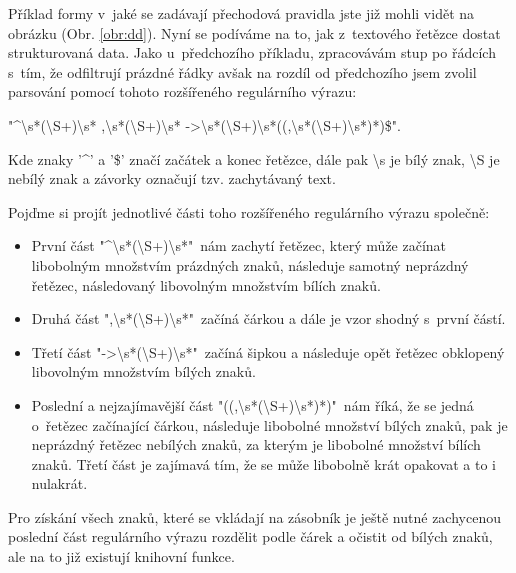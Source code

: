 
Příklad formy v~jaké se zadávají přechodová pravidla jste již mohli vidět na obrázku (Obr. \ref{obr:dd}). Nyní se podíváme na to, jak z~textového řetězce dostat strukturovaná data. Jako u~předchozího příkladu, zpracovávám stup po řádcích s~tím, že odfiltrují prázdné řádky avšak na rozdíl od předchozího jsem zvolil parsování pomocí tohoto rozšířeného regulárního výrazu: 

"\textasciicircum\textbackslash{}s*(\textbackslash{}S+)\textbackslash{}s*
,\textbackslash{}s*(\textbackslash{}S+)\textbackslash{}s*
->\textbackslash{}s*(\textbackslash{}S+)\textbackslash{}s*((,\textbackslash{}s*(\textbackslash{}S+)\textbackslash{}s*)*)\$". 

Kde znaky '\textasciicircum' a '\$' značí začátek a konec řetězce, dále pak \textbackslash{}s je bílý znak, \textbackslash{}S je nebílý znak a závorky označují tzv. zachytávaný text.

Pojďme si projít jednotlivé části toho rozšířeného regulárního výrazu společně:

\begin{itemize}
	\item První část "\textasciicircum\textbackslash{}s*(\textbackslash{}S+)\textbackslash{}s*"\ nám zachytí řetězec, který může začínat libobolným množstvím prázdných znaků, následuje samotný neprázdný řetězec, následovaný libovolným množstvím bílích znaků.
	\item Druhá část ",\textbackslash{}s*(\textbackslash{}S+)\textbackslash{}s*"\ začíná čárkou a dále je vzor shodný s~první částí.
	\item Třetí část "->\textbackslash{}s*(\textbackslash{}S+)\textbackslash{}s*"\ začíná šipkou a následuje opět řetězec obklopený libovolným množstvím bílých znaků.
	\item Poslední a nejzajímavější část "((,\textbackslash{}s*(\textbackslash{}S+)\textbackslash{}s*)*)"\ nám říká, že se jedná o~řetězec začínající čárkou, následuje libobolné množství bílých znaků, pak je neprázdný řetězec nebílých znaků, za kterým je libobolné množství bílích znaků. Třetí část je zajímavá tím, že se může libobolně krát opakovat a to i nulakrát.
\end{itemize}

Pro získání všech znaků, které se vkládají na zásobník je ještě nutné zachycenou poslední část regulárního výrazu rozdělit podle čárek a očistit od bílých znaků, ale na to již existují knihovní funkce.

